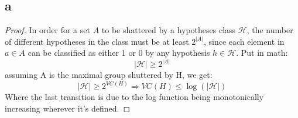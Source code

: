 \subsection*{a}
\begin{proof}
    In order for a set $A$ to be shattered by a hypotheses class $\mathcal{H}$, the number of different hypotheses in the class must be at least $2^{|A|}$, 
    since each element in $a \in A$ can be classified as either 1 or 0 by any hypothesis $h \in \mathcal{H}$. Put in math:
\begin{equation*}
    |\mathcal{H}| \geq 2^{|A|}
\end{equation*}
    assuming A is the maximal group shuttered by H, we get:
    \begin{equation*}
        |\mathcal{H}| \geq 2^{VC(H)} \Rightarrow VC(H) \leq \log (|\mathcal{H}|)
    \end{equation*}
    Where the last transition is due to the log function being monotonically increasing wherever it's defined.
\end{proof}

